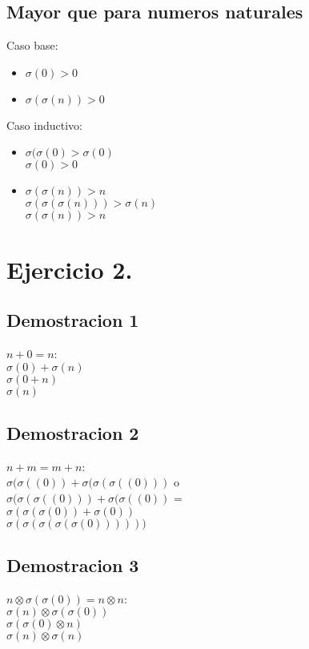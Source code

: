 \documentclass{article}
\begin{document}
\subsection{Mayor que para numeros naturales}
Caso base: 
\begin{itemize}
\item$\sigma(0) > 0$
\item$\sigma(\sigma(n))>0$
\end{itemize}
Caso inductivo:
\begin{itemize}
\item$\sigma(\sigma(0) > \sigma(0)$\\
$\sigma(0) > 0$\\
\item$\sigma(\sigma(n)) > n$\\
$\sigma(\sigma(\sigma(n))) > \sigma(n)$\\
$\sigma(\sigma(n))>n$
\end{itemize}
\section{Ejercicio 2.}
\subsection{Demostracion 1}
\begin{center}
$n+0=n$:\\
$\sigma(0) + \sigma(n)$\\
$\sigma (0 + n)$\\
$\sigma(n)$
\end{center}
\subsection{Demostracion 2}
\begin{center}
$n+m = m+n$:\\
$\sigma(\sigma((0)) + \sigma(\sigma(\sigma((0)))$ o \\
$\sigma(\sigma(\sigma((0))) + \sigma(\sigma((0))$ =\\
$\sigma (\sigma(\sigma(0)) + \sigma(0))$\\
$\sigma(\sigma(\sigma(\sigma(\sigma(0))))))$
\end{center}
\subsection{Demostracion 3}
\begin{center}
$n \otimes \sigma(\sigma(0)) = n \otimes n$:\\
$\sigma(n) \otimes \sigma(\sigma(0))$\\
$\sigma (\sigma(0) \otimes n)$\\
$\sigma(n) \otimes \sigma(n)$
\end{center}
\end{document}

